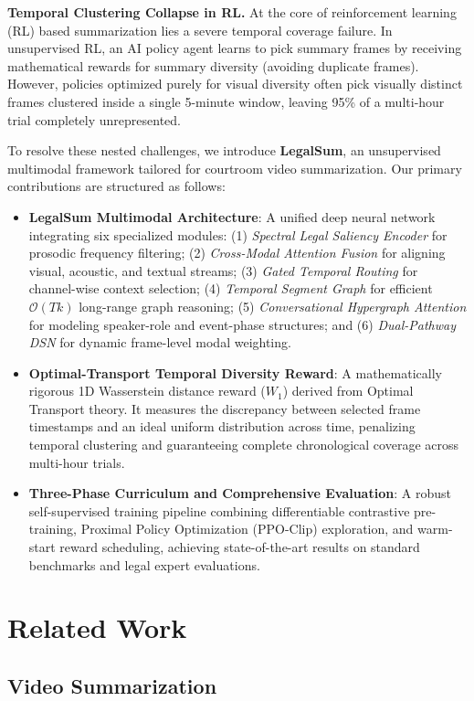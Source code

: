 \documentclass[letterpaper]{article}
\begin{document}
\textbf{Temporal Clustering Collapse in RL.} At the core of reinforcement learning (RL) based summarization lies a severe temporal coverage failure. In unsupervised RL, an AI policy agent learns to pick summary frames by receiving mathematical rewards for summary diversity (avoiding duplicate frames). However, policies optimized purely for visual diversity often pick visually distinct frames clustered inside a single 5-minute window, leaving 95\% of a multi-hour trial completely unrepresented.

To resolve these nested challenges, we introduce \textbf{LegalSum}, an unsupervised multimodal framework tailored for courtroom video summarization. Our primary contributions are structured as follows:
\begin{itemize}
\item \textbf{LegalSum Multimodal Architecture}: A unified deep neural network integrating six specialized modules: (1) \textit{Spectral Legal Saliency Encoder} for prosodic frequency filtering; (2) \textit{Cross-Modal Attention Fusion} for aligning visual, acoustic, and textual streams; (3) \textit{Gated Temporal Routing} for channel-wise context selection; (4) \textit{Temporal Segment Graph} for efficient $\mathcal{O}(Tk)$ long-range graph reasoning; (5) \textit{Conversational Hypergraph Attention} for modeling speaker-role and event-phase structures; and (6) \textit{Dual-Pathway DSN} for dynamic frame-level modal weighting.
\item \textbf{Optimal-Transport Temporal Diversity Reward}: A mathematically rigorous 1D Wasserstein distance reward ($W_1$) derived from Optimal Transport theory. It measures the discrepancy between selected frame timestamps and an ideal uniform distribution across time, penalizing temporal clustering and guaranteeing complete chronological coverage across multi-hour trials.
\item \textbf{Three-Phase Curriculum and Comprehensive Evaluation}: A robust self-supervised training pipeline combining differentiable contrastive pre-training, Proximal Policy Optimization (PPO-Clip) exploration, and warm-start reward scheduling, achieving state-of-the-art results on standard benchmarks and legal expert evaluations.
\end{itemize}

\section{Related Work}

\subsection{Video Summarization}
\end{document}
